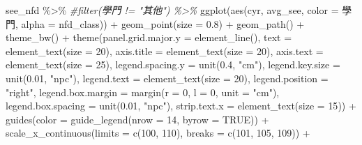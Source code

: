 \documentclass[
]{article}
\newenvironment{Shaded}{\begin{snugshade}}{\end{snugshade}}
\newcommand{\AttributeTok}[1]{\textcolor[rgb]{0.77,0.63,0.00}{#1}}
\newcommand{\CommentTok}[1]{\textcolor[rgb]{0.56,0.35,0.01}{\textit{#1}}}
\newcommand{\ConstantTok}[1]{\textcolor[rgb]{0.00,0.00,0.00}{#1}}
\newcommand{\DecValTok}[1]{\textcolor[rgb]{0.00,0.00,0.81}{#1}}
\newcommand{\FloatTok}[1]{\textcolor[rgb]{0.00,0.00,0.81}{#1}}
\newcommand{\FunctionTok}[1]{\textcolor[rgb]{0.00,0.00,0.00}{#1}}
\newcommand{\NormalTok}[1]{#1}
\newcommand{\SpecialCharTok}[1]{\textcolor[rgb]{0.00,0.00,0.00}{#1}}
\newcommand{\StringTok}[1]{\textcolor[rgb]{0.31,0.60,0.02}{#1}}
\begin{document}
\begin{Shaded}
\begin{Highlighting}[]
\NormalTok{see\_nfd }\SpecialCharTok{\%\textgreater{}\%}
  \CommentTok{\#filter(學門 != "其他") \%\textgreater{}\%}
  \FunctionTok{ggplot}\NormalTok{(}\FunctionTok{aes}\NormalTok{(cyr, avg\_see, }\AttributeTok{color =}\NormalTok{ 學門, }\AttributeTok{alpha =}\NormalTok{ nfd\_class)) }\SpecialCharTok{+}
  \FunctionTok{geom\_point}\NormalTok{(}\AttributeTok{size =} \FloatTok{0.8}\NormalTok{) }\SpecialCharTok{+}
  \FunctionTok{geom\_path}\NormalTok{() }\SpecialCharTok{+}
  \FunctionTok{theme\_bw}\NormalTok{() }\SpecialCharTok{+}
  \FunctionTok{theme}\NormalTok{(}\AttributeTok{panel.grid.major.y =} \FunctionTok{element\_line}\NormalTok{(), }
        \AttributeTok{text =} \FunctionTok{element\_text}\NormalTok{(}\AttributeTok{size =} \DecValTok{20}\NormalTok{), }
        \AttributeTok{axis.title =} \FunctionTok{element\_text}\NormalTok{(}\AttributeTok{size =} \DecValTok{20}\NormalTok{),}
        \AttributeTok{axis.text =} \FunctionTok{element\_text}\NormalTok{(}\AttributeTok{size =} \DecValTok{25}\NormalTok{),}
        \AttributeTok{legend.spacing.y =} \FunctionTok{unit}\NormalTok{(}\FloatTok{0.4}\NormalTok{, }\StringTok{"cm"}\NormalTok{),}
        \AttributeTok{legend.key.size =} \FunctionTok{unit}\NormalTok{(}\FloatTok{0.01}\NormalTok{, }\StringTok{"npc"}\NormalTok{),}
        \AttributeTok{legend.text =} \FunctionTok{element\_text}\NormalTok{(}\AttributeTok{size =} \DecValTok{20}\NormalTok{),}
        \AttributeTok{legend.position =} \StringTok{"right"}\NormalTok{,}
        \AttributeTok{legend.box.margin =} \FunctionTok{margin}\NormalTok{(}\AttributeTok{r =} \DecValTok{0}\NormalTok{, }\AttributeTok{l =} \DecValTok{0}\NormalTok{, }\AttributeTok{unit =} \StringTok{"cm"}\NormalTok{),}
        \AttributeTok{legend.box.spacing =} \FunctionTok{unit}\NormalTok{(}\FloatTok{0.01}\NormalTok{, }\StringTok{"npc"}\NormalTok{),}
        \AttributeTok{strip.text.x =} \FunctionTok{element\_text}\NormalTok{(}\AttributeTok{size =} \DecValTok{15}\NormalTok{)) }\SpecialCharTok{+}
  \FunctionTok{guides}\NormalTok{(}\AttributeTok{color =} \FunctionTok{guide\_legend}\NormalTok{(}\AttributeTok{nrow =} \DecValTok{14}\NormalTok{, }\AttributeTok{byrow =} \ConstantTok{TRUE}\NormalTok{)) }\SpecialCharTok{+}
  \FunctionTok{scale\_x\_continuous}\NormalTok{(}\AttributeTok{limits =} \FunctionTok{c}\NormalTok{(}\DecValTok{100}\NormalTok{, }\DecValTok{110}\NormalTok{), }\AttributeTok{breaks =} \FunctionTok{c}\NormalTok{(}\DecValTok{101}\NormalTok{, }\DecValTok{105}\NormalTok{, }\DecValTok{109}\NormalTok{)) }\SpecialCharTok{+}

\end{Highlighting}
\end{Shaded}
\end{document}

